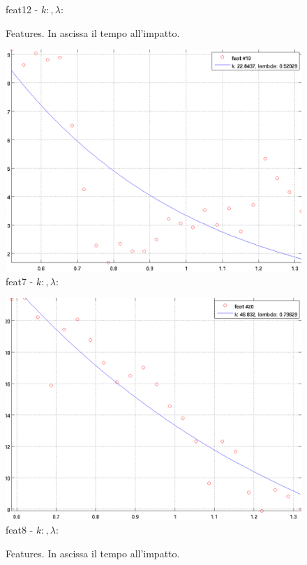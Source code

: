 \documentclass[12pt]{report}
\begin{document}
\begin{figure}
\begin{minipage}[t]{0.3\linewidth}
	feat12 - $k: , \lambda:  $\\
\end{minipage}
\caption[short]{Features. In ascissa il tempo all'impatto.}
\label{fig:feats3}
\end{figure}

\begin{figure}
\begin{minipage}[t]{0.5\linewidth}
	\centering
	\includegraphics[scale=\imFeatScale]{images/feat19}
	feat7 - $k: , \lambda:  $\\
\end{minipage}
\begin{minipage}[t]{0.5\linewidth}
	\centering
	\includegraphics[scale=\imFeatScale]{images/feat20}
	feat8 - $k: , \lambda:  $\\
\end{minipage}
\caption[short]{Features. In ascissa il tempo all'impatto.}
\label{fig:feats4}
\end{figure}
\end{document}
